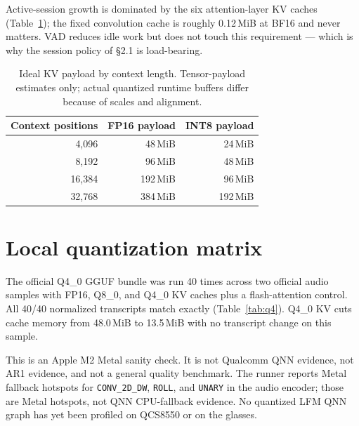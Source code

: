 \documentclass[10pt,twocolumn,letterpaper]{article}
\begin{document}
Active-session growth is dominated by the six attention-layer KV caches
(Table~\ref{tab:kv}); the fixed convolution cache is roughly 0.12\,MiB at
BF16 and never matters. VAD reduces idle work but does not touch this
requirement --- which is why the session policy of \S2.1 is load-bearing.

\begin{table}[t]
\centering
\small
\caption{Ideal KV payload by context length. Tensor-payload estimates only;
actual quantized runtime buffers differ because of scales and alignment.}
\label{tab:kv}
\begin{tabular}{@{}rrr@{}}
\toprule
\textbf{Context positions} & \textbf{FP16 payload} & \textbf{INT8 payload} \\
\midrule
4,096 & 48\,MiB & 24\,MiB \\
8,192 & 96\,MiB & 48\,MiB \\
16,384 & 192\,MiB & 96\,MiB \\
32,768 & 384\,MiB & 192\,MiB \\
\bottomrule
\end{tabular}
\end{table}

\section{Local quantization matrix}
\label{sec:q4}

The official Q4\_0 GGUF bundle was run 40 times across two official audio
samples with FP16, Q8\_0, and Q4\_0 KV caches plus a flash-attention control.
All 40/40 normalized transcripts match exactly (Table~\ref{tab:q4}). Q4\_0 KV
cuts cache memory from 48.0\,MiB to 13.5\,MiB with no transcript change on
this sample.

This is an Apple M2 Metal sanity check. It is not Qualcomm QNN evidence, not
AR1 evidence, and not a general quality benchmark. The runner reports Metal
fallback hotspots for \texttt{CONV\_2D\_DW}, \texttt{ROLL}, and
\texttt{UNARY} in the audio encoder; those are Metal hotspots, not QNN
CPU-fallback evidence. No quantized LFM QNN graph has yet been profiled on
QCS8550 or on the glasses.
\end{document}
